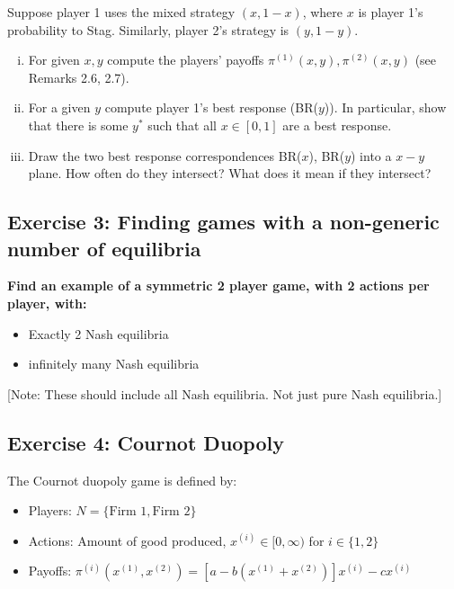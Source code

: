 \documentclass[10pt]{article}
\begin{document}
Suppose player 1 uses the mixed strategy \((x, 1- x)\), where \(x\) is player 1's
probability to Stag. Similarly, player 2's strategy is \((y, 1 - y)\).

\begin{enumerate}[(i)]
    \item For given \(x, y\) compute the players' payoffs \(\pi^{(1)}(x, y),
    \pi^{(2)}(x, y)\) (see Remarks 2.6, 2.7).
    \item For a given \(y\) compute player 1's best response (BR(\(y\))). In
    particular, show that there is some \(y^{*}\) such that all \(x \in [0,
    1]\) are a best response.
    \item Draw the two best response correspondences BR(\(x\)), BR(\(y\)) into a
    \(x-y\) plane. How often do they intersect? What does it mean if they
    intersect?
\end{enumerate}

\subsection*{Exercise 3: Finding games with a non-generic number of equilibria}

\textbf{Find an example of a symmetric 2 player game, with 2 actions per player, with:}

\begin{itemize}
    \item Exactly 2 Nash equilibria
    \item infinitely many Nash equilibria
\end{itemize}

[Note: These should include all Nash equilibria. Not just pure Nash equilibria.]

\subsection*{Exercise 4: Cournot Duopoly}

The Cournot duopoly game is defined by:

\begin{itemize}
    \item Players: \(N = \{\text{Firm } 1, \text{Firm } 2\}\)
    \item Actions: Amount of good produced, \(x^{(i)} \in [0, \infty)\) for \(i \in \{1, 2\}\)
    \item Payoffs: \(\pi^{(i)}(x^{(1)}, x^{(2)}) = [a - b (x^{(1)} + x^{(2)})] x^{(i)} - c x^{(i)}\)
\end{itemize}
\end{document}
